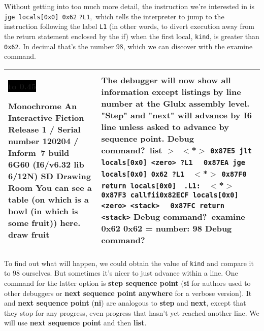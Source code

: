 \documentclass{book}
\newcommand{\n}{\hspace*{\fill}\newline}
\newcommand{\terp}[2]{\begin{center}\begin{tabular}{p{0.45\textwidth}|p{0.45\textwidth}}\midrule #1&#2\\\midrule\end{tabular}\end{center}}
\newcommand{\glkheading}[1]{\textbf{#1}}
\newcommand{\glkinput}[1]{\textbf{#1}}
\newcommand{\glkstatusline}[2]{\centerline{\colorbox{black}{\hbox to 0.45\textwidth{\textcolor{white}{#1\hfil #2}}}}}
\newcommand{\storyprompt}{\raisebox{1.5pt}{\(>\)}}
\newcommand{\cursor}{\raisebox{-1.5pt}{\RectangleThin}}
\newcommand{\markeddip}{\(>\)\ }
\newcommand{\unmarkeddip}{\hphantom{\(>\)}\ }
\begin{document}
Without getting into too much more detail, the instruction we're interested in
is \lstinline{jge locals[0x0] 0x62} \hbox{\lstinline{?L1}, which} tells the
interpreter to jump to the instruction following the label \lstinline{L1} (in
other words, to divert execution away from the return statement enclosed by the
if) when the first local, \lstinline{kind}, is greater than \lstinline{0x62}.
In decimal that's the number 98, which we can discover with the examine command.

\terp{\glkstatusline{Drawing Room}{0/1}\n
  \glkheading{Monochrome}\n
  An Interactive Fiction\n
  Release 1 / Serial number 120204 / Inform~7 build 6G60 (I6/v6.32 lib 6/12N) SD\n
  \n
  \glkheading{Drawing Room}\n
  You can see a table (on which is a bowl (in which is some fruit)) here.\n
  \n
  \storyprompt\glkinput{draw fruit}}{%
  The debugger will now show all information except listings by line number at the Glulx assembly level.  "Step" and "next" will advance by I6 line unless asked to advance by sequence point.\n
  \n
  Debug command?\ \glkinput{list}\n
  \n
  \markeddip \(<\)*\(>\) \lstinline{0x87E5 jlt locals[0x0] <zero> ?L1}\n
  \unmarkeddip \hphantom{\(<\)*\(>\)} \lstinline{0x87EA jge locals[0x0] 0x62 ?L1}\n
  \unmarkeddip \(<\)*\(>\) \lstinline{0x87F0 return locals[0x0]}\n
  \unmarkeddip \lstinline{.L1:}\n
  \unmarkeddip \(<\)*\(>\) \lstinline @0x87F3 callfii@\hfill\lstinline @0x82ECF locals[0x0] <zero> <stack>@\n
  \unmarkeddip \hphantom{\(<\)*\(>\)} \lstinline{0x87FC return <stack>}\n
  \n
  Debug command?\ \glkinput{examine 0x62}\n
  \n
  0x62 = number: 98\n
  \n
  Debug command?\ \cursor}

To find out what will happen, we could obtain the value of \lstinline{kind} and
compare it to 98 ourselves.  But sometimes it's nicer to just advance within a
line.  One command for the latter option is \glkinput{step sequence point}
(\glkinput{si} for authors used to other debuggers or \glkinput{next sequence
  point anywhere} for a verbose version).  It and \glkinput{next sequence point}
(\glkinput{ni}) are analogous to \glkinput{step} and \glkinput{next}, except
that they stop for any progress, even progress that hasn't yet reached another
line.  We will use \glkinput{next sequence point} and then \glkinput{list}.
\end{document}

